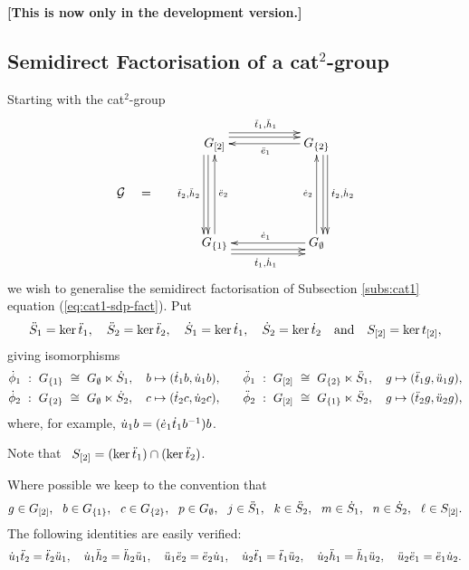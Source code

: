 
\newpage
\noindent
{\bf [This is now only in the development version.]}

\bigskip
\subsection{Semidirect Factorisation of a cat$^2$-group}
\label{subs:sdpfact-catt}

Starting with the cat$^2$-group 
$$
\xymatrix @C=2pc @R=2pc{
 & \GGot \ar[dd] <-1.2ex>  \ar[dd] <-2.0ex>_{\ddttt,\ddhht}
     \ar[rr] <+1.2ex>  \ar[rr] <+2.0ex>^{\ddtto,\ddhho}
    &&  \GGbt  \ar[ll]^{\ddeeo}
            \ar[dd]<+1.2ex>  \ar[dd] <+2.0ex>^{\dttt,\dhht}  \\
\calG \quad = \quad
 &  &&   \\
 & \GGbo \ar[uu]_{\ddeet}
     \ar[rr] <-1.2ex>  \ar[rr] <-2.0ex>_{\dtto,\dhho} 
    &&  \GGe \ar[uu]^{\deet}   \ar[ll]_{\deeo} 
 \\
}
$$
we wish to generalise the semidirect factorisation of 
Subsection \ref{subs:cat1} equation (\ref{eq:cat1-sdp-fact}).
Put
$$
\ddot{S}_1 = \ker\ddot{t}_1, \quad
\ddot{S}_2 = \ker\ddot{t}_2, \quad
 \dot{S}_1 = \ker\dot{t}_1, \quad
 \dot{S}_2 = \ker\dot{t}_2 \quad\mbox{and}\quad
 S_{[2]} = \ker t_{[2]},
$$
giving isomorphisms
\begin{eqnarray*}
\dot{\phi}_1 ~:~ G_{\{1\}} ~\cong~ G_{\emptyset} \ltimes \dot{S}_1,
  \quad  b \mapsto (\dot{t}_1 b, \dot{u}_1 b), 
& \quad &
\ddot{\phi}_1 ~:~ G_{[2]} ~\cong~ G_{\{2\}} \ltimes \ddot{S}_1,
  \quad  g \mapsto (\ddot{t}_1 g, \ddot{u}_1 g),      \\
\dot{\phi}_2 ~:~ G_{\{2\}} ~\cong~ G_{\emptyset} \ltimes \dot{S}_2,
  \quad  c \mapsto (\dot{t}_2 c, \dot{u}_2 c),   
& \quad &
\ddot{\phi}_2 ~:~ G_{[2]} ~\cong~ G_{\{1\}} \ltimes \ddot{S}_2,
  \quad  g \mapsto (\ddot{t}_2 g, \ddot{u}_2 g), 
\end{eqnarray*}
where, for example, $\dot{u}_1 b = (\dot{e}_1\dot{t}_1 b^{-1})b$.

\medskip\noindent
Note that~ $S_{[2]} = (\ker \ddot{t}_1) \cap (\ker \ddot{t}_2)$.

\medskip\noindent
Where possible we keep to the convention that
$$
g \in G_{[2]},~~
b \in G_{\{1\}},~~
c \in G_{\{2\}},~~
p \in G_{\emptyset},~~
j \in \ddot{S}_1,~~
k \in \ddot{S}_2,~~
m \in \dot{S}_1,~~
n \in \dot{S}_2,~~
\ell \in S_{[2]}.
$$
The following identities are easily verified:
\begin{equation} \label{eq:cat2gp-ids}
\dot{u}_1\ddot{t}_2 = \ddot{t}_2\ddot{u}_1, \quad
\dot{u}_1\ddot{h}_2 = \ddot{h}_2\ddot{u}_1, \quad
\ddot{u}_1\ddot{e}_2 = \ddot{e}_2\dot{u}_1, \quad
\dot{u}_2\ddot{t}_1 = \ddot{t}_1\ddot{u}_2, \quad
\dot{u}_2\ddot{h}_1 = \ddot{h}_1\ddot{u}_2, \quad
\ddot{u}_2\ddot{e}_1 = \ddot{e}_1\dot{u}_2. 
\end{equation} 

